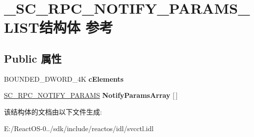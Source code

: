 \hypertarget{struct___s_c___r_p_c___n_o_t_i_f_y___p_a_r_a_m_s___l_i_s_t}{}\section{\+\_\+\+S\+C\+\_\+\+R\+P\+C\+\_\+\+N\+O\+T\+I\+F\+Y\+\_\+\+P\+A\+R\+A\+M\+S\+\_\+\+L\+I\+S\+T结构体 参考}
\label{struct___s_c___r_p_c___n_o_t_i_f_y___p_a_r_a_m_s___l_i_s_t}
\subsection*{Public 属性}
\begin{DoxyCompactItemize}
\item 
\mbox{\label{struct___s_c___r_p_c___n_o_t_i_f_y___p_a_r_a_m_s___l_i_s_t_acdc5cbff8900b1502ceb34666ca4dde4}} 
B\+O\+U\+N\+D\+E\+D\+\_\+\+D\+W\+O\+R\+D\+\_\+4K {\bfseries c\+Elements}
\item 
\mbox{\label{struct___s_c___r_p_c___n_o_t_i_f_y___p_a_r_a_m_s___l_i_s_t_aea3b38576df7155da3c4257116be3dfd}} 
\hyperlink{struct___s_c___r_p_c___n_o_t_i_f_y___p_a_r_a_m_s}{S\+C\+\_\+\+R\+P\+C\+\_\+\+N\+O\+T\+I\+F\+Y\+\_\+\+P\+A\+R\+A\+MS} {\bfseries Notify\+Params\+Array} \mbox{[}$\,$\mbox{]}
\end{DoxyCompactItemize}


该结构体的文档由以下文件生成\+:\begin{DoxyCompactItemize}
\item 
E\+:/\+React\+O\+S-\/0../sdk/include/reactos/idl/svcctl.\+idl\end{DoxyCompactItemize}
